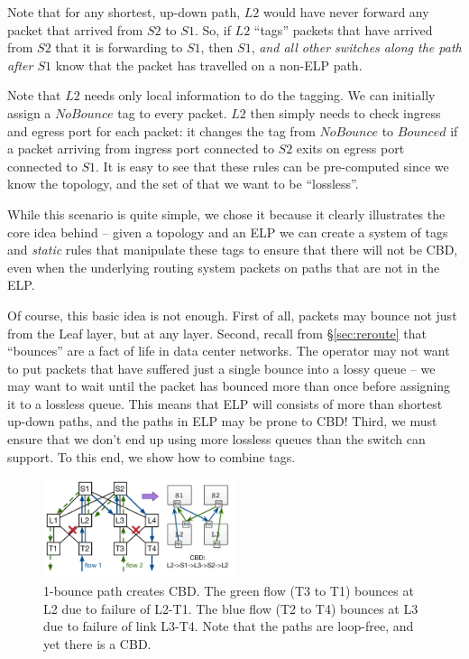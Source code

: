 Note that for any shortest, up-down path, $L2$ would have never
forward any packet that arrived from $S2$ to $S1$. So, if $L2$ ``tags'' packets
that have arrived from $S2$ that it is forwarding to $S1$, then $S1$, {\em and
all other switches along the path after $S1$} know that the packet has travelled
on a non-ELP path.

Note that $L2$ needs only local information to do the tagging. We can initially
assign a $NoBounce$ tag to every packet. $L2$ then simply needs to check ingress
and egress port for each packet: it changes the tag from $NoBounce$ to $Bounced$
if a packet arriving from ingress port connected to $S2$ exits on egress port
connected to $S1$.  It is easy to see that these rules can be pre-computed since
we know the topology, and the set of  that we want to be ``lossless''.

While this scenario is quite simple, we chose it because it clearly illustrates
the core idea behind \sysname{} -- given a topology and an ELP we can create a
system of tags and {\em static} rules that manipulate these tags to ensure that
there will not be CBD, even when the underlying routing system packets on paths
that are not in the ELP.

Of course, this basic idea is not enough. First of all, packets may bounce not
just from the Leaf layer, but at any layer. Second, recall from
\S\ref{sec:reroute} that ``bounces'' are a fact of life in data center networks.
The operator may not want to put packets that have suffered just a single bounce
into a lossy queue -- we may want to wait until the packet has bounced more than
once before assigning it to a lossless queue. This means that ELP will consists
of more than shortest up-down paths, and the paths in ELP may be prone to CBD!
Third, we must ensure that we don't end up using more lossless queues than the
switch can support. To this end, we show how to combine tags.

\begin{figure}[t]
	\centering
	\includegraphics[width=0.5\textwidth] {figs/cbd_a}
		\caption{1-bounce path creates CBD. The green flow (T3 to T1) bounces at L2 due to failure
		of L2-T1. The blue flow (T2 to T4) bounces at L3 due to failure of link
		L3-T4. Note that the paths are loop-free, and yet there is a CBD.}
	\label{fig:clos_1_bounce}
\end{figure}

